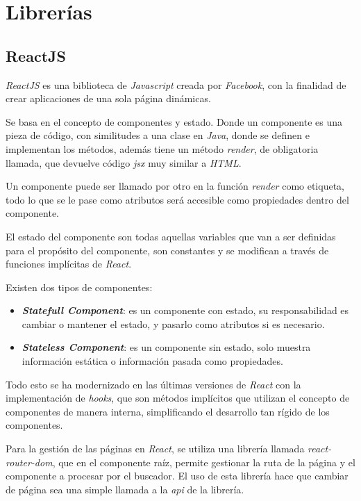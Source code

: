 \section{Librerías}
\subsection{ReactJS}
\textit{ReactJS} es una biblioteca de \textit{Javascript} creada por \textit{Facebook}, con la finalidad de crear aplicaciones de una sola página dinámicas.

Se basa en el concepto de componentes y estado. Donde un componente es una pieza de código, con similitudes a una clase en \textit{Java}, donde se definen e implementan los métodos, además tiene un método \textit{render}, de obligatoria llamada, que devuelve código \textit{jsx} muy similar a \textit{HTML}.\cite{React}

Un componente puede ser llamado por otro en la función \textit{render} como etiqueta, todo lo que se le pase como atributos será accesible como propiedades dentro del componente.

El estado del componente son todas aquellas variables que van a ser definidas para el propósito del componente, son constantes y se modifican a través de funciones implícitas de \textit{React}.

Existen dos tipos de componentes:
\begin{itemize}
    \item \textit{\textbf{Statefull Component}}: es un componente con estado, su responsabilidad es cambiar o mantener el estado, y pasarlo como atributos si es necesario.
    \item \textit{\textbf{Stateless Component}}: es un componente sin estado, solo muestra información estática o información pasada como propiedades.
\end{itemize}

Todo esto se ha modernizado en las últimas versiones de \textit{React} con la implementación de \textit{hooks}, que son métodos implícitos que utilizan el concepto de componentes de manera interna, simplificando el desarrollo tan rígido de los componentes.

Para la gestión de las páginas en \textit{React}, se utiliza una librería llamada \textit{react-router-dom}, que en el componente raíz, permite gestionar la ruta de la página y el componente a procesar por el buscador. El uso de esta librería hace que cambiar de página sea una simple llamada a la \textit{api} de la librería.

